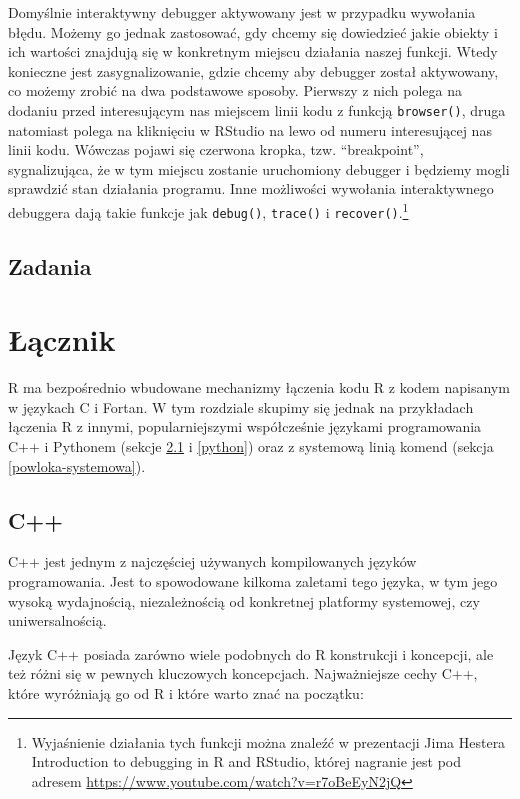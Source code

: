 \documentclass[paper=6in:9in,pagesize=pdftex,headinclude=on,footinclude=on,10pt]{scrbook}
\begin{document}
Domyślnie interaktywny debugger aktywowany jest w przypadku wywołania błędu.
Możemy go jednak zastosować, gdy chcemy się dowiedzieć jakie obiekty i ich wartości znajdują się w konkretnym miejscu działania naszej funkcji.
Wtedy konieczne jest zasygnalizowanie, gdzie chcemy aby debugger został aktywowany, co możemy zrobić na dwa podstawowe sposoby.
Pierwszy z nich polega na dodaniu przed interesującym nas miejscem linii kodu z funkcją \texttt{browser()}, druga natomiast polega na kliknięciu w RStudio na lewo od numeru interesującej nas linii kodu.
Wówczas pojawi się czerwona kropka, tzw. ``breakpoint'', sygnalizująca, że w tym miejscu zostanie uruchomiony debugger i będziemy mogli sprawdzić stan działania programu.
Inne możliwości wywołania interaktywnego debuggera dają takie funkcje jak \texttt{debug()}, \texttt{trace()} i \texttt{recover()}.\footnote{Wyjaśnienie działania tych funkcji można znaleźć w prezentacji Jima Hestera Introduction to debugging in R and RStudio, której nagranie jest pod adresem \url{https://www.youtube.com/watch?v=r7oBeEyN2jQ}}

\hypertarget{zadania-11}{%
\section{Zadania}\label{zadania-11}}

\hypertarget{lacznik}{%
\chapter{Łącznik}\label{lacznik}}

R ma bezpośrednio wbudowane mechanizmy łączenia kodu R z kodem napisanym w językach C i Fortan.
W tym rozdziale skupimy się jednak na przykładach łączenia R z innymi, popularniejszymi współcześnie językami programowania C++ i Pythonem (sekcje \ref{cpp} i \ref{python}) oraz z systemową linią komend (sekcja \ref{powloka-systemowa}).

\hypertarget{cpp}{%
\section{C++}\label{cpp}}

C++ jest jednym z najczęściej używanych kompilowanych języków programowania.
Jest to spowodowane kilkoma zaletami tego języka, w tym jego wysoką wydajnością, niezależnością od konkretnej platformy systemowej, czy uniwersalnością.

Język C++ posiada zarówno wiele podobnych do R konstrukcji i koncepcji, ale też różni się w pewnych kluczowych koncepcjach.
Najważniejsze cechy C++, które wyróżniają go od R i które warto znać na początku:
\end{document}
